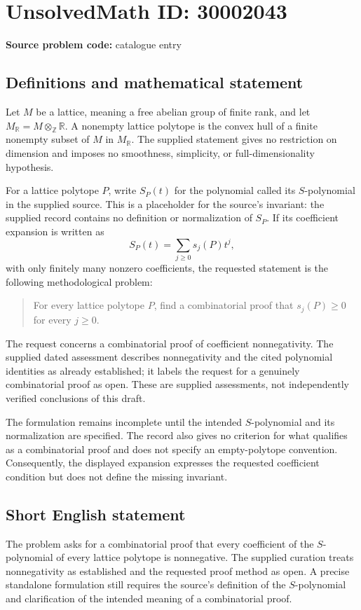 \documentclass[11pt]{article}
\newcommand{\Z}{\mathbb{Z}}
\newcommand{\R}{\mathbb{R}}
\begin{document}
\section*{UnsolvedMath ID: 30002043}
\textbf{Source problem code:} catalogue entry
\subsection{Definitions and mathematical statement}
Let \(M\) be a lattice, meaning a free abelian group of finite rank, and let \(M_{\R}=M\otimes_{\Z}\R\). A nonempty lattice polytope is the convex hull of a finite nonempty subset of \(M\) in \(M_{\R}\). The supplied statement gives no restriction on dimension and imposes no smoothness, simplicity, or full-dimensionality hypothesis.

For a lattice polytope \(P\), write \(S_P(t)\) for the polynomial called its \(S\)-polynomial in the supplied source. This is a placeholder for the source's invariant: the supplied record contains no definition or normalization of \(S_P\). If its coefficient expansion is written as
\[
S_P(t)=\sum_{j\geq 0}s_j(P)t^j,
\]
with only finitely many nonzero coefficients, the requested statement is the following methodological problem:
\begin{quote}
For every lattice polytope \(P\), find a combinatorial proof that \(s_j(P)\geq 0\) for every \(j\geq 0\).
\end{quote}
The request concerns a combinatorial proof of coefficient nonnegativity. The supplied dated assessment describes nonnegativity and the cited polynomial identities as already established; it labels the request for a genuinely combinatorial proof as open. These are supplied assessments, not independently verified conclusions of this draft.

The formulation remains incomplete until the intended \(S\)-polynomial and its normalization are specified. The record also gives no criterion for what qualifies as a combinatorial proof and does not specify an empty-polytope convention. Consequently, the displayed expansion expresses the requested coefficient condition but does not define the missing invariant.
\subsection{Short English statement}
The problem asks for a combinatorial proof that every coefficient of the \(S\)-polynomial of every lattice polytope is nonnegative. The supplied curation treats nonnegativity as established and the requested proof method as open. A precise standalone formulation still requires the source's definition of the \(S\)-polynomial and clarification of the intended meaning of a combinatorial proof.
\end{document}
